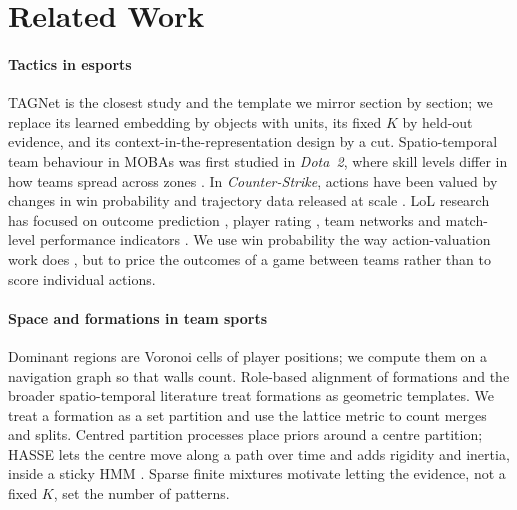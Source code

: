 \section{Related Work}
\label{sec:related}

\paragraph*{Tactics in esports}
TAGNet \citep{zhang2026tagnet} is the closest study and the template we mirror section by section; we replace its learned embedding by objects with units, its fixed $K$ by held-out evidence, and its context-in-the-representation design by a cut.
Spatio-temporal team behaviour in MOBAs was first studied in \emph{Dota~2}, where skill levels differ in how teams spread across zones \citep{drachen2014skill}.
In \emph{Counter-Strike}, actions have been valued by changes in win probability \citep{xenopoulos2020valuing} and trajectory data released at scale \citep{xenopoulos2022esta}.
LoL research has focused on outcome prediction \citep{hodge2021win,yang2022predicting}, player rating \citep{maymin2020smart,debois2025pandaskill}, team networks \citep{mora2019team} and match-level performance indicators \citep{novak2020performance}.
We use win probability the way action-valuation work does \citep{decroos2019actions,xenopoulos2020valuing}, but to price the outcomes of a game between teams rather than to score individual actions.

\paragraph*{Space and formations in team sports}
Dominant regions \citep{taki2000visualization} are Voronoi cells of player positions; we compute them on a navigation graph so that walls count.
Role-based alignment of formations \citep{lucey2013representing,bialkowski2014large} and the broader spatio-temporal literature \citep{gudmundsson2017spatio} treat formations as geometric templates.
We treat a formation as a set partition and use the lattice metric \citep{monjardet1981metrics} to count merges and splits.
Centred partition processes \citep{paganin2021centered} place priors around a centre partition; HASSE lets the centre move along a path over time and adds rigidity and inertia, inside a sticky HMM \citep{fox2011sticky}.
Sparse finite mixtures \citep{fruhwirth2019here} motivate letting the evidence, not a fixed $K$, set the number of patterns.

